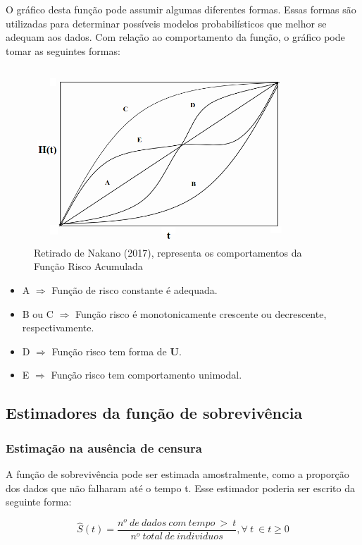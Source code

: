 \documentclass[a4paper,12pt]{article}
\begin{document}
O gráfico desta função pode assumir algumas diferentes formas. Essas formas são utilizadas para determinar possíveis modelos probabilísticos que melhor se adequam aos dados. Com relação ao comportamento da função, o gráfico pode tomar as seguintes formas:
\begin{figure}[H]
  \centering
  \includegraphics[width=10cm]{risco_acum.png}
  \caption{Retirado de Nakano (2017), representa os comportamentos da Função Risco Acumulada}
\end{figure}

\begin{itemize}
	\item A $\Rightarrow$ Função de risco constante é adequada.
	\item B ou C $\Rightarrow$ Função
risco é monotonicamente crescente ou decrescente, respectivamente.
	\item D $\Rightarrow$ Função risco tem forma de \textbf{U}.
	\item E $\Rightarrow$ Função risco tem comportamento unimodal.
\end{itemize}

\subsection{Estimadores da função de sobrevivência}

\subsubsection{Estimação na ausência de censura}

A função de sobrevivência pode ser estimada amostralmente, como a proporção dos dados que não falharam até o tempo t. Esse estimador poderia ser escrito da seguinte forma:

$$ \hat{S}(t) = \dfrac{n^o \ de \ dados \ com \ tempo \ > \ t}{n^o \ total \ de \ individuos}, \forall \ t \ \in t\ge 0$$
\end{document}
